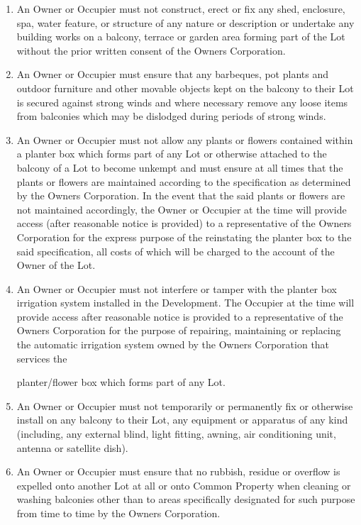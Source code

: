 \documentclass{article}
\begin{document}
\begin{enumerate}[label=\arabic*.]
\begin{enumerate}[label=\arabic{enumi}.\arabic*.]
\begin{enumerate}[label=\arabic{enumi}.\arabic*.]
\begin{enumerate}[label=(\arabic*)]
\begin{enumerate}[label=(\alph*)]
\item  An Owner or Occupier must not construct, erect or fix any shed, enclosure, spa, water feature, or structure of any nature or description or undertake any building works on a balcony, terrace or garden area forming part of the Lot without the prior written consent of the Owners Corporation.

\item  An Owner or Occupier must ensure that any barbeques, pot plants and outdoor furniture and other movable objects kept on the balcony to their Lot is secured against strong winds and where necessary remove any loose items from balconies which may be dislodged during periods of strong winds.

\item  An Owner or Occupier must not allow any plants or flowers contained within a planter box which forms part of any Lot or otherwise attached to the balcony of a Lot to become unkempt and must ensure at all times that the plants or flowers are maintained according to the specification as determined by the Owners Corporation. In the event that the said plants or flowers are not maintained accordingly, the Owner or Occupier at the time will provide access (after reasonable notice is provided) to a representative of the Owners Corporation for the express purpose of the reinstating the planter box to the said specification, all costs of which will be charged to the account of the Owner of the Lot.

\item  An Owner or Occupier must not interfere or tamper with the planter box irrigation system installed in the Development. The Occupier at the time will provide access after reasonable notice is provided to a representative of the Owners Corporation for the purpose of repairing, maintaining or replacing the automatic irrigation system owned by the Owners Corporation that services the
\newpage

planter/flower box which forms part of any Lot.

\item  An Owner or Occupier must not temporarily or permanently fix or otherwise install on any balcony to their Lot, any equipment or apparatus of any kind (including, any external blind, light fitting, awning, air conditioning unit, antenna or satellite dish).

\item  An Owner or Occupier must ensure that no rubbish, residue or overflow is expelled onto another Lot at all or onto Common Property when cleaning or washing balconies other than to areas specifically designated for such purpose from time to time by the Owners Corporation.


\end{enumerate}
\end{enumerate}
\end{enumerate}
\end{enumerate}
\end{enumerate}
\end{document}
